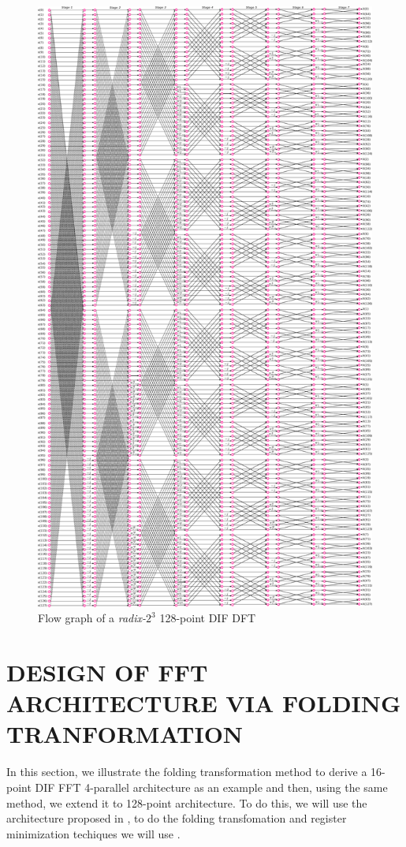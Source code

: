 \documentclass[journal,comsoc]{IEEEtran}
\begin{document}
\begin{figure} 
	\centering
	\includegraphics[width=\linewidth]{Diagramas/miSeccionFiguras/128PuntosRadix8Conexion.pdf}
	\caption{Flow graph of a \textit{radix-}$2^3$ 128-point DIF DFT}
	\label{fig:128ponits_conn}
\end{figure}



 
\section{DESIGN OF FFT ARCHITECTURE VIA FOLDING TRANFORMATION}
In this section, we illustrate the folding transformation method to derive a 16-point DIF FFT 4-parallel architecture as an example and then, using the same method, we extend it to 128-point architecture. To do this, we will use the architecture proposed in \cite{ayinala_pipelined_2012}, to do the folding transfomation and register minimization techiques we will use \cite{folding_parhi_book}.
\end{document}
